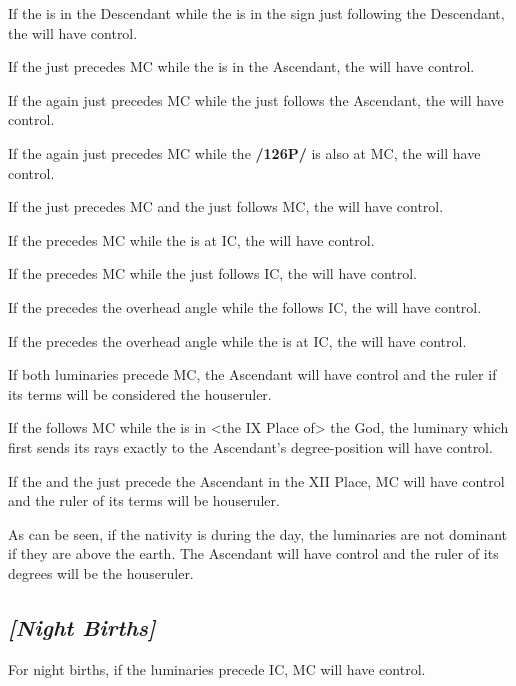 If the \Moon\xspace is in the Descendant while the \Sun\xspace is in the sign just following the Descendant, the \Sun\xspace will have control. 

If the \Sun\xspace just precedes MC while the \Moon\xspace
is in the Ascendant, the \Moon\xspace will have control. 

If the \Sun\xspace again just precedes MC while the \Moon\xspace just follows the Ascendant, the \Moon\xspace will have control. 

If the \Sun\xspace again just precedes MC while the \Moon\xspace \textbf{/126P/} is also at MC, the \Moon\xspace will have control. 

If the \Sun\xspace just precedes MC and the \Moon\xspace just follows MC, the \Moon\xspace will have control. 

If the \Moon\xspace precedes MC while the \Sun\xspace is at IC, the \Sun\xspace will have control. 

If the \Moon\xspace precedes MC while the \Sun\xspace just follows IC, the \Sun\xspace will have control. 

If the \Sun\xspace precedes the overhead angle while the \Moon\xspace follows IC, the \Moon\xspace will have control. 

If the \Sun\xspace precedes the overhead angle while the \Moon\xspace is at IC, the \Moon\xspace will have control. 

If both luminaries precede MC, the Ascendant will have control and the ruler if its terms will be considered the houseruler. 

If the \Moon\xspace follows MC while the \Sun\xspace is in <the IX Place of> the God, the luminary which first sends its rays exactly to the Ascendant’s degree-position will have control. 

If the \Sun\xspace and the \Moon\xspace just precede the Ascendant in the XII Place, MC will have control and the ruler of its terms will be houseruler.

As can be seen, if the nativity is during the day, the luminaries are not dominant if they are above the earth. The Ascendant will have control and the ruler of its degrees will be the houseruler. 

\subsection{\textit{[Night Births]}}

For night births, if the luminaries precede IC, MC will have control. 

